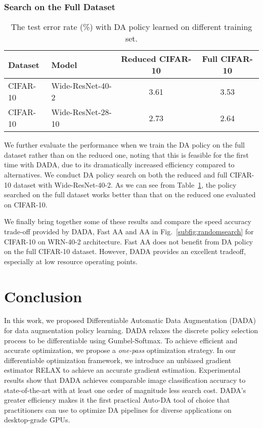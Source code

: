 \documentclass[runningheads]{llncs}
\begin{document}
\subsubsection{Search on the Full Dataset}
\begin{table}[t]
	\centering
	\caption{{The test error rate (\%) with DA policy learned on different training set.}}
	\begin{tabular}{llcc}
		\toprule
		Dataset & Model & Reduced CIFAR-10 & Full CIFAR-10 \\
		\midrule
		CIFAR-10 & Wide-ResNet-40-2 & 3.61  & 3.53 \\
		CIFAR-10 & Wide-ResNet-28-10 & 2.73  & 2.64 \\
		\bottomrule
	\end{tabular}\label{tab:dataset}\end{table}We further evaluate the performance when we train the DA policy on the full dataset rather than on the reduced one, noting that this is feasible for the first time with DADA, due to its dramatically increased efficiency compared to alternatives. {We conduct DA policy search on both the reduced and full CIFAR-10 dataset with Wide-ResNet-40-2.}
As we can see from  Table~\ref{tab:dataset}, the policy searched on the full dataset works better than that on the reduced one evaluated on CIFAR-10.


We finally bring together some of these results and compare the speed accuracy trade-off provided by DADA, Fast AA and AA in Fig.~\ref{subfig:randomsearch} for CIFAR-10 on WRN-40-2 architecture.  Fast AA does not benefit from DA policy on the full CIFAR-10 dataset. However, DADA provides an excellent tradeoff, especially at low resource operating points.





 
\section{Conclusion}
\label{sec:conclusion}


In this work, we proposed Differentiable Automatic Data Augmentation (DADA)  for data augmentation policy learning. DADA relaxes the discrete policy selection process to be differentiable using Gumbel-Softmax. To achieve efficient and accurate optimization, we propose a \emph{one-pass} optimization strategy. In our differentiable optimization framework, we introduce an unbiased gradient estimator RELAX to achieve an accurate gradient estimation. Experimental results show that DADA achieves comparable image classification accuracy to state-of-the-art with at least one order of magnitude less search cost. 
DADA's greater efficiency makes it the first practical Auto-DA tool of choice that practitioners can use to optimize DA pipelines for diverse applications on desktop-grade GPUs. 
\end{document}
